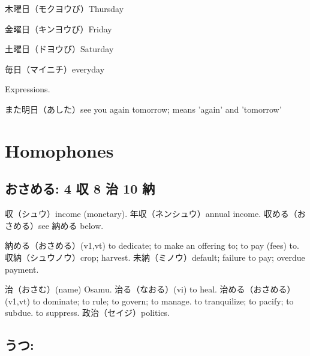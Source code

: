 木曜日（モクヨウび）Thursday

金曜日（キンヨウび）Friday

土曜日（ドヨウび）Saturday

毎日（マイニチ）everyday

Expressions.

また明日（あした）see you again tomorrow; means 'again' and 'tomorrow'

\section{Homophones}

\subsection{おさめる: 4 収 8 治 10 納}

収（シュウ）income (monetary).
年収（ネンシュウ）annual income.
収める（おさめる）see 納める below.

納める（おさめる）(v1,vt)
to dedicate; to make an offering to; to pay (fees) to.
収納（シュウノウ）crop; harvest.
未納（ミノウ）default; failure to pay; overdue payment.

治（おさむ）(name) Osamu.
治る（なおる）(vi) to heal.
治める（おさめる）(v1,vt)
to dominate; to rule; to govern; to manage.
to tranquilize; to pacify; to subdue.
to suppress.
政治（セイジ）politics.

\subsection{うつ:}
